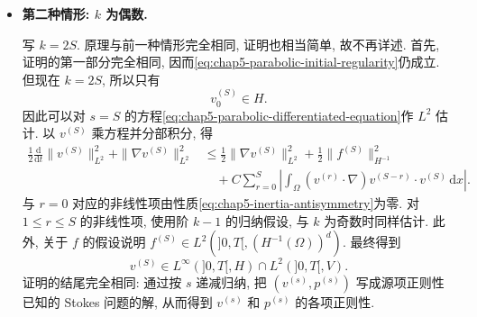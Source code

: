 \begin{Proof}
\begin{itemize}
 将 $s=S$ 代入方程\eqref{eq:chap5-parabolic-differentiated-equation}, 投影到无散度向量场集合后,
 \[
 v^{(S+1)}=\frac{\partial v^{(S)}}{\partial t}
 =-Av^{(S)}-\sum_{r=0}^S\binom SrP\bigl((v^{(r)}\cdot\nabla)v^{(S-r)}\bigr)+Pf^{(S)}.
 \]
 由关于 $f^{(s)}$ 的假设和刚得到的结果, 立即有
 \[
 v^{(S+1)}\in L^\infty(]0,T[,V')\cap L^2(]0,T[,H).
 \]
 还可以把 $s=S$ 的方程\eqref{eq:chap5-parabolic-differentiated-equation}改写为
 \[
 Av^{(S)}=-\Delta v^{(S)}+\nabla p^{(S)}
 =f^{(S)}-\frac{\partial v^{(S)}}{\partial t}
 +\sum_{r=0}^S\binom Sr(v^{(r)}\cdot\nabla)v^{(S-r)}.
 \]
 这把 $(v^{(S)},p^{(S)})$ 看作某个类 Stokes 问题的解. 关于 $v^{(S+1)}$ 的结果和关于 $f$ 的假设表明, 该类 Stokes 问题的源项属于 $L^\infty(]0,T[,V')\cap L^2(]0,T[,(L^2(\Omega))^d)$. 使用 Stokes 问题的正则性定理 (Proposition~\ref{thm:chap4-stokes-regularity}) 以及 $A$ 是从 $V$ 到 $V'$ 的同构这一事实, 得
 \[
 v^{(S)}\in L^\infty(]0,T[,V)\cap L^2(]0,T[,(H^2(\Omega))^d\cap V),
 \qquad
 p^{(S)}\in L^2(]0,T[,H^1(\Omega)).
 \]
 证明的结尾现在很清楚. 从 $s=S$ 到 $s=0$ 作反向归纳, 每次把 $(v^{(s)},p^{(s)})$ 写成 Stokes 问题
 \[
 -\Delta v^{(s)}+\nabla p^{(s)}
 =f^{(s)}-\frac{\partial v^{(s)}}{\partial t}
 +\sum_{r=0}^s\binom sr(v^{(r)}\cdot\nabla)v^{(s-r)}
 \]
的解, 其中源项的正则性由第 $s+1$ 阶结果给出. 这就完成了 $k$ 为奇数时的证明.

 \item \textbf{第二种情形: $k$ 为偶数.}

 写 $k=2S$. 原理与前一种情形完全相同, 证明也相当简单, 故不再详述. 首先, 证明的第一部分完全相同, 因而\eqref{eq:chap5-parabolic-initial-regularity}仍成立. 但现在 $k=2S$, 所以只有
 \[
 v_0^{(S)}\in H.
 \]
 因此可以对 $s=S$ 的方程\eqref{eq:chap5-parabolic-differentiated-equation}作 $L^2$ 估计. 以 $v^{(S)}$ 乘方程并分部积分, 得
 \begin{align*}
 \frac12\frac{\mathrm d}{\mathrm dt}\|v^{(S)}\|_{L^2}^2
 +\|\nabla v^{(S)}\|_{L^2}^2
 &\leq\frac12\|\nabla v^{(S)}\|_{L^2}^2
 +\frac12\|f^{(S)}\|_{H^{-1}}^2\\
 &\quad+C\sum_{r=0}^S
 \left|\int_\Omega(v^{(r)}\cdot\nabla)v^{(S-r)}\cdot v^{(S)}\,\mathrm dx\right|.
 \end{align*}
 与 $r=0$ 对应的非线性项由性质\eqref{eq:chap5-inertia-antisymmetry}为零. 对 $1\leq r\leq S$ 的非线性项, 使用阶 $k-1$ 的归纳假设, 与 $k$ 为奇数时同样估计. 此外, 关于 $f$ 的假设说明 $f^{(S)}\in L^2(]0,T[,(H^{-1}(\Omega))^d)$. 最终得到
 \[
 v^{(S)}\in L^\infty(]0,T[,H)\cap L^2(]0,T[,V).
 \]
 证明的结尾完全相同: 通过按 $s$ 递减归纳, 把 $(v^{(s)},p^{(s)})$ 写成源项正则性已知的 Stokes 问题的解, 从而得到 $v^{(s)}$ 和 $p^{(s)}$ 的各项正则性.
\end{itemize}
\end{Proof}


